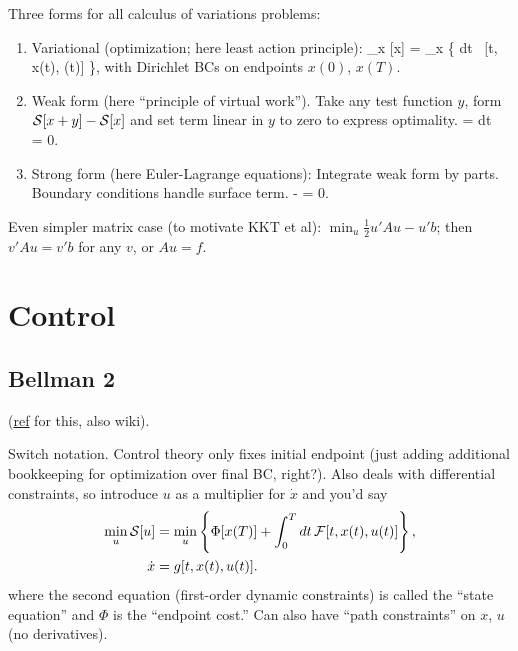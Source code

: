 \documentclass[notitlepage,openany,11pt]{report}
\numberwithin{equation}{section}
\theoremstyle{plain}%
\begin{document}
Three forms for all calculus of variations problems:
\begin{enumerate}
\item Variational (optimization; here least action principle):
\be
\min_{x} [x] = \min_{x} \left\{ \int \! dt \, [t, x(t), (t)] \right\},
\ee with Dirichlet BCs on endpoints $x(0)$, $x(T)$. 
\item Weak form (here ``principle of virtual work''). Take any test function $y$, form $\mathcal{S}[x+y] - \mathcal{S}[x]$ and set term linear in $y$ to zero to express optimality. 
\be
\delta {} = \int dt \, = 0.
\ee
\item Strong form (here Euler-Lagrange equations): Integrate weak form by parts. Boundary conditions handle surface term.
\be
{} -   = 0.
\ee
\end{enumerate}
Even simpler matrix case (to motivate KKT et al): $\min_{u} \tfrac{1}{2} u' A u - u' b$; then $v' A u = v' b$ for any $v$, or $Au = f$.


\section{Control}

\subsection{Bellman 2}
(\href{https://math.stackexchange.com/questions/782621/difference-between-variation-of-calculus-problems-and-control-theory-problems}{ref} for this, also wiki). 

Switch notation. Control theory only fixes initial endpoint (just adding additional bookkeeping for optimization over final BC, right?). Also deals with differential constraints, so introduce $u$ as a multiplier for $\dot{x}$ and you'd say
\begin{align*}
\min_{u} \mathcal{S}[u] &= \min_{u}\left\{ \Phi[x(T)] + \int_{0}^{T} dt \, \mathcal{F}[t, x(t), u(t)] \right\}, \\
\dot{x} &= g[t, x(t), u(t)].
\end{align*}
where the second equation (first-order dynamic constraints) is called the ``state equation'' and $\Phi$ is the ``endpoint cost.'' Can also have ``path constraints'' on $x$, $u$ (no derivatives).
\end{document}
